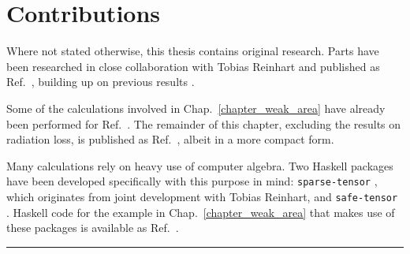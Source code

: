 \chapter{Contributions}

Where not stated otherwise, this thesis contains original research. Parts have been researched in close collaboration with Tobias Reinhart and published as Ref.\ \cite{Alex_2020}, building up on previous results \cite{Reinhart_2018}.

Some of the calculations involved in Chap.~\ref{chapter_weak_area} have already been performed for Ref.\ \cite{Alex_2019}. The remainder of this chapter, excluding the results on radiation loss, is published as Ref.\ \cite{Alex_2020_2}, albeit in a more compact form.

Many calculations rely on heavy use of computer algebra. Two Haskell packages have been developed specifically with this purpose in mind: \texttt{sparse-tensor} \cite{Reinhart_2019_sparse-tensor}, which originates from joint development with Tobias Reinhart, and \texttt{safe-tensor} \cite{Alex_2020_safe-tensor}. Haskell code for the example in Chap.~\ref{chapter_weak_area} that makes use of these packages is available as Ref.\ \cite{Alex_2020_area-metric-gravity}.

\noindent\rule{\textwidth}{0.4pt}

\cite{Alex_2020}~

\cite{Reinhart_2018}~

\cite{Alex_2019}~

\cite{Alex_2020_2}~

\cite{Reinhart_2019_sparse-tensor}~

\cite{Alex_2020_safe-tensor}~

\cite{Alex_2020_area-metric-gravity}~

